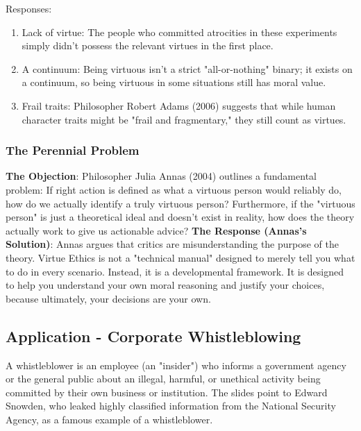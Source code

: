 \documentclass[12pt]{article}
\begin{document}
\begin{enumerate}
    Responses:
    \begin{enumerate}
        \item Lack of virtue: The people who committed atrocities in these experiments simply didn't possess the relevant virtues in the first place.
        \item A continuum: Being virtuous isn't a strict "all-or-nothing" binary; it exists on a continuum, so being virtuous in some situations still has moral value.
        \item Frail traits: Philosopher Robert Adams (2006) suggests that while human character traits might be "frail and fragmentary," they still count as virtues.
    \end{enumerate}
\end{enumerate}

\subsubsection{The Perennial Problem}
\textbf{The Objection}: Philosopher Julia Annas (2004) outlines a fundamental problem: If right action is defined as what a virtuous person would reliably do, how do we actually identify a truly virtuous person? Furthermore, if the "virtuous person" is just a theoretical ideal and doesn't exist in reality, how does the theory actually work to give us actionable advice?\newline
\textbf{The Response (Annas's Solution)}: Annas argues that critics are misunderstanding the purpose of the theory. Virtue Ethics is not a "technical manual" designed to merely tell you what to do in every scenario. Instead, it is a developmental framework. It is designed to help you understand your own moral reasoning and justify your choices, because ultimately, your decisions are your own.

\subsection{Application - Corporate Whistleblowing}
A whistleblower is an employee (an "insider") who informs a government agency or the general public about an illegal, harmful, or unethical activity being committed by their own business or institution.\newline
The slides point to Edward Snowden, who leaked highly classified information from the National Security Agency, as a famous example of a whistleblower.
\end{document}
